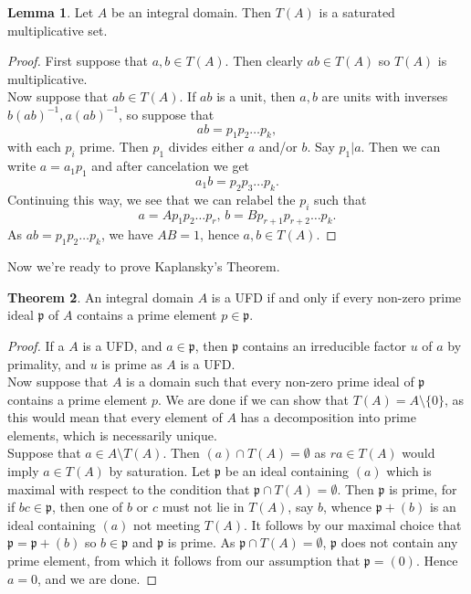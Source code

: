 \documentclass{article}
\theoremstyle{definition}
\newtheorem{theorem}{Theorem}[section]
\newtheorem{lemma}[theorem]{Lemma}
\begin{document}
\begin{lemma}
	Let $A$ be an integral domain. Then $T(A)$ is a saturated multiplicative
	set.
\end{lemma}
\begin{proof}
	First suppose that $a, b \in T(A)$. Then clearly $ab \in T(A)$ so $T(A)$
	is multiplicative. \\

	Now suppose that $ab \in T(A)$. If $ab$ is a unit, then $a, b$ are units
	with inverses $b(ab)^{-1}, a(ab)^{-1}$, so suppose that 
	\[
		ab = p_1p_2 \ldots p_k,
	\] 
	with each $p_i$ prime. Then $p_1$ divides either $a$ and/or $b$.
	Say $p_1 | a$. Then we can write $a = a_1 p_1$ and after cancelation
	we get 
	\[
		a_1 b = p_2 p_3 \ldots p_k.
	\] 
	Continuing this way, we see that we can relabel the $p_i$ such that 
	\[
		a = A p_1 p_2 \ldots p_r, \,
		b = B p_{r + 1} p_{r + 2} \ldots p_k.
	\] 
	As $ab = p_1 p_2 \ldots p_k$, we have $AB = 1$,
	hence $a, b \in T(A)$.
\end{proof}

Now we're ready to prove Kaplansky's Theorem.

\begin{theorem}
	An integral domain $A$ is a UFD if and only if every non-zero prime ideal
	$\mathfrak{p}$ of $A$ contains a prime element $p \in \mathfrak{p}$.
\end{theorem}
\begin{proof}
	If a $A$ is a UFD, and $a \in \mathfrak{p}$, then $\mathfrak{p}$ contains
	an irreducible factor $u$ of $a$ by primality, and $u$ is prime as $A$ is a
	UFD. \\

	Now suppose that $A$ is a domain such that every non-zero prime ideal of
	$\mathfrak{p}$ contains a prime element $p$. We are done if we can show
	that $T(A) = A \setminus \{0\}$, as this would mean that every element of
	$A$ has a decomposition into prime elements, which is necessarily unique.
	\\

	Suppose that $a \in A \setminus T(A)$. Then $(a) \cap T(A) = \emptyset$ as
	$ra \in T(A)$ would imply $a \in T(A)$ by saturation. Let $\mathfrak{p}$ be
	an ideal containing $(a)$ which is maximal with respect to the condition
	that $\mathfrak{p} \cap T(A) = \emptyset$. Then $\mathfrak{p}$ is prime,
	for if $bc \in \mathfrak{p}$, then one of $b$ or $c$ must not lie in
	$T(A)$, say $b$, whence $\mathfrak{p} + (b)$ is an ideal containing
	$(a)$ not meeting $T(A)$. It follows by our maximal choice that
	$\mathfrak{p} = \mathfrak{p} + (b)$ so $b \in \mathfrak{p}$ and
	$\mathfrak{p}$ is prime. As $\mathfrak{p} \cap T(A) = \emptyset$,
	$\mathfrak{p}$ does not contain any prime element, from which it follows
	from our assumption that $\mathfrak{p} = (0)$. Hence $a = 0$, and we are
	done.

\end{proof}
\end{document}
